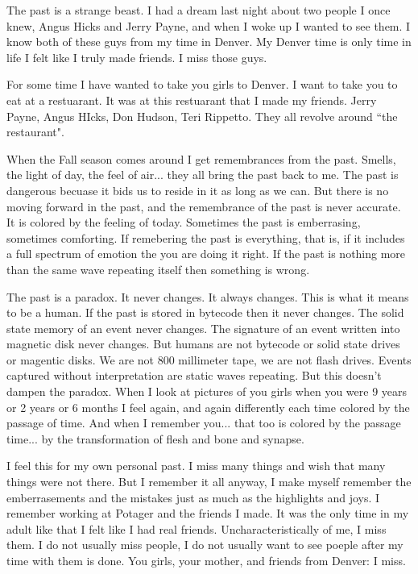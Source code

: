 The past is a strange beast. I had a dream last night about two people I once knew, Angus Hicks and Jerry Payne, and when I woke up I wanted to see them. I know both of these guys from my time in Denver. My Denver time is only time in life I felt like I truly made friends. I miss those guys.

For some time I have wanted to take you girls to Denver. I want to take you to eat at a restuarant. It was at this restuarant that I made my friends. Jerry Payne, Angus HIcks, Don Hudson, Teri Rippetto. They all revolve around ``the restaurant".

When the Fall season comes around I get remembrances from the past. Smells, the light of day, the feel of air... they all bring the past back to me. The past is dangerous becuase it bids us to reside in it as long as we can. But there is no moving forward in the past, and the remembrance of the past is never accurate. It is colored by the feeling of today. Sometimes the past is emberrasing, sometimes comforting. If remebering the past is everything, that is, if it includes a full spectrum of emotion the you are doing it right. If the past is nothing more than the same wave repeating itself then something is wrong.

The past is a paradox. It never changes. It always changes. This is what it means to be a human. If the past is stored in bytecode then it never changes. The solid state memory of an event never changes. The signature of an event written into magnetic disk never changes. But humans are not bytecode or solid state drives or magentic disks. We are not 800 millimeter tape, we are not flash drives. Events captured without interpretation are static waves repeating. But this doesn't dampen the paradox. When I look at pictures of you girls when you were 9 years or 2 years or 6 months I feel again, and again differently each time colored by the passage of time. And when I remember you... that too is colored by the passage time... by the transformation of flesh and bone and synapse.

I feel this for my own personal past. I miss many things and wish that many things were not there. But I remember it all anyway, I make myself remember the emberrasements and the mistakes just as much as the highlights and joys. I remember working at Potager and the friends I made. It was the only time in my adult like that I felt like I had real friends. Uncharacteristically of me, I miss them. I do not usually miss people, I do not usually want to see poeple after my time with them is done. You girls, your mother, and friends from Denver: I miss.